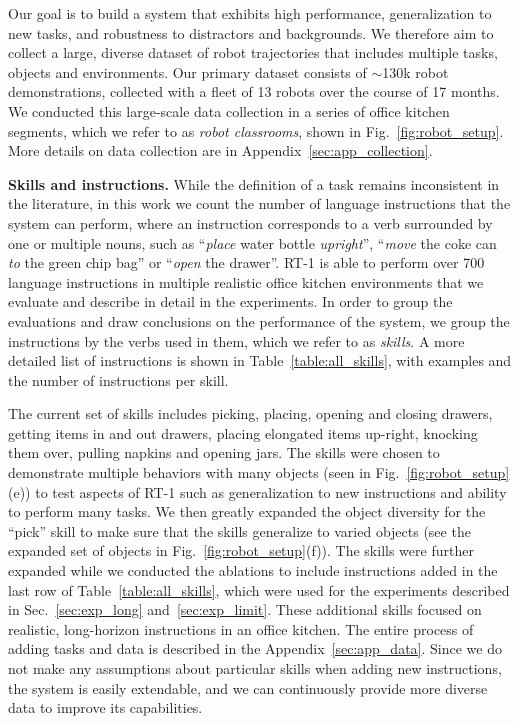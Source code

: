 \documentclass{article} %
\newcommand{\algname}{RT-1\xspace}
\begin{document}
Our goal is to build a system that exhibits high performance, generalization to new tasks, and robustness to distractors and backgrounds. We therefore aim to collect a large, diverse dataset of robot trajectories that includes multiple tasks, objects and environments. 
Our primary dataset consists of $\sim$130k robot demonstrations, collected with a fleet of 13 robots over the course of 17 months.
We conducted this large-scale data collection in a series of office kitchen segments, which we refer to as \textit{robot classrooms}, shown in Fig.~\ref{fig:robot_setup}. More details on data collection are in Appendix~\ref{sec:app_collection}.


\textbf{Skills and instructions.} While the definition of a task remains inconsistent in the literature, in this work we count the number of language instructions that the system can perform, where an instruction corresponds to a verb surrounded by one or multiple nouns, such as ``\textit{place} water bottle \textit{upright}'', ``\textit{move} the coke can \textit{to} the green chip bag'' or ``\textit{open} the drawer''. 
\algname is able to perform  over 700 language instructions in multiple realistic office kitchen environments that we evaluate and describe in detail in the experiments. 
In order to group the evaluations and draw conclusions on the performance of the system, we group the instructions by the verbs used in them, which we refer to as \textit{skills}. 
A more detailed list of instructions is shown in Table~\ref{table:all_skills}, with examples and the number of instructions per skill. 

The current set of skills includes picking, placing, opening and closing drawers, getting items in and out drawers, placing elongated items up-right, knocking them over, pulling napkins and opening jars. 
The skills were chosen to demonstrate multiple behaviors with many objects (seen in Fig.~\ref{fig:robot_setup}(e)) to test aspects of \algname such as generalization to new instructions and ability to perform many tasks. 
We then greatly expanded the object diversity for the ``pick'' skill to make sure that the skills generalize to varied objects (see the expanded set of objects in Fig.~\ref{fig:robot_setup}(f)).
The skills were further expanded while we conducted the ablations to include instructions added in the last row of Table~\ref{table:all_skills}, which were used for the experiments described in Sec.~\ref{sec:exp_long} and~\ref{sec:exp_limit}.
These additional skills focused on realistic, long-horizon instructions in an office kitchen. %
The entire process of adding tasks and data is described in the Appendix~\ref{sec:app_data}.
Since we do not make any assumptions about particular skills when adding new instructions, the system is easily extendable, and we can continuously provide more diverse data to improve its capabilities.
\end{document}
